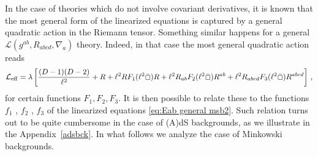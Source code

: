 \documentclass[11pt]{article}
\newcommand{\be}{\begin{equation}}
\newcommand{\ee}{\end{equation} }
\begin{document}

In the case of theories which do not involve covariant derivatives, it is known that the most general form of the linearized equations is captured by a general quadratic action in the Riemann tensor. Something similar happens for a general $\mathcal{L}(g^{ab},R_{abcd},\nabla_a)$ theory. Indeed, in that case the most general quadratic action reads
\be \label{effq}
\mathcal{L}_{\rm eff} = \lambda\left[\frac{(D-1)(D-2)}{\ell^2}+R+ \ell^2 R F_1(\ell^2 \bar \Box) R + \ell^2 R_{ab}   F_2(\ell^2 \bar \Box) R^{ab}+\ell^2 R_{abcd} F_3(\ell^2\bar \Box)R^{abcd}\right]\, ,
\ee
for certain functions $F_1,F_2,F_3$. It is then possible to relate these to the functions $f_{1}$ , $f_{2}$ , $f_{3}$ of the linearized equations \eqref{eq:Eab general msb2}. Such relation turns out to be quite cumbersome in the case of (A)dS backgrounds, as we illustrate in the Appendix~\ref{adsbck}. In what follows we analyze the case of Minkowski backgrounds. 
\end{document}
